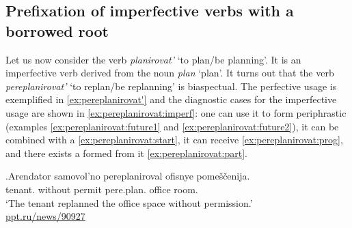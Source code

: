 

\subsection{Prefixation of imperfective verbs with a borrowed root}\label{subsection:perf:imperf}
Let us now consider the verb \textit{planirovat'} `to plan/be planning'. It is an imperfective verb derived from the noun \textit{plan} `plan'. It turns out that the verb \textit{pereplanirovat'} `to replan/be replanning' is biaspectual. The perfective usage is exemplified in \ref{ex:pereplanirovat'} and the diagnostic cases for the imperfective usage are shown in \ref{ex:pereplanirovat:imperf}: one can use it to form periphrastic  (examples \ref{ex:pereplanirovat:future1} and \ref{ex:pereplanirovat:future2}), it can be combined with a  \ref{ex:pereplanirovat:start}, it can receive  \ref{ex:pereplanirovat:prog}, and there exists a  formed from it \ref{ex:pereplanirovat:part}. 

\exg.\label{ex:pereplanirovat'}Arendator samovol'no pereplaniroval\textsuperscript{\PF} ofisnye pome\v{s}\v{c}enija.\\
tenant. {without permit} pere.plan. office room.\\
\trans `The tenant replanned the office space without permission.'\\\hbox{}\hfill\hbox{\url{ppt.ru/news/90927}}

